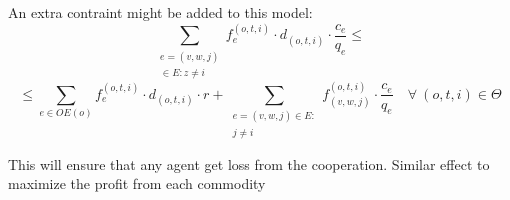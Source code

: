\documentclass{article}
\begin{document}
An extra contraint might be added to this model:
\[\sum_{\substack{e=(v,w,j)\\ \in E \colon z\not = i}} f_e^{(o,t,i)}\cdot d_{(o,t,i)} \cdot \frac{c_e}{q_e} \leq\] 
\[\leq \sum_{e\in OE(o)} f_e^{(o,t,i)}\cdot d_{(o,t,i)}\cdot r  +  \sum_{\substack{e=(v,w,j) \in E \colon  \\ j \not = i}} f_{(v,w,j)}^{(o,t,i)} \cdot \frac{c_e}{q_e} \quad \forall\ (o,t,i) \in \Theta \]

This will ensure that any agent get loss from the cooperation. Similar effect to maximize the profit from each commodity
\end{document}
